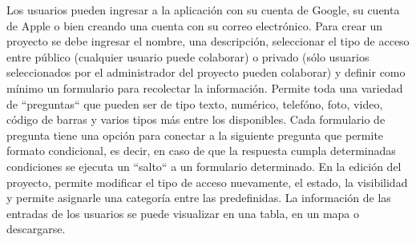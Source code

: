 Los usuarios pueden ingresar a la aplicación con su cuenta de Google, su cuenta de Apple o bien creando una cuenta con su correo electrónico. Para crear un proyecto se debe ingresar el nombre, una descripción, seleccionar el tipo de acceso entre público (cualquier usuario puede colaborar) o privado (sólo usuarios seleccionados por el administrador del proyecto pueden colaborar) y definir como mínimo un formulario para recolectar la información. Permite toda una variedad de ``preguntas“ que pueden ser de tipo texto, numérico, telefóno, foto, video, código de barras y varios tipos más entre los disponibles. Cada formulario de pregunta tiene una opción para conectar a la siguiente pregunta que permite formato condicional, es decir, en caso de que la respuesta cumpla determinadas condiciones se ejecuta un ``salto“ a un formulario determinado. En la edición del proyecto, permite modificar el tipo de acceso nuevamente, el estado, la visibilidad y permite asignarle una categoría entre las predefinidas.
La información de las entradas de los usuarios se puede visualizar en una tabla, en un mapa o descargarse.\cite{epicollect} 


